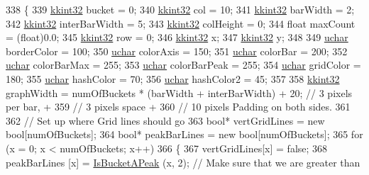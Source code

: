\begin{DoxyCode}
338 \{
339   \hyperlink{namespace_k_k_b_a8fa4952cc84fda1de4bec1fbdd8d5b1b}{kkint32} bucket        = 0;
340   \hyperlink{namespace_k_k_b_a8fa4952cc84fda1de4bec1fbdd8d5b1b}{kkint32} col           = 10;
341   \hyperlink{namespace_k_k_b_a8fa4952cc84fda1de4bec1fbdd8d5b1b}{kkint32} barWidth      = 2;
342   \hyperlink{namespace_k_k_b_a8fa4952cc84fda1de4bec1fbdd8d5b1b}{kkint32} interBarWidth = 5;
343   \hyperlink{namespace_k_k_b_a8fa4952cc84fda1de4bec1fbdd8d5b1b}{kkint32} colHeight     = 0;
344   \textcolor{keywordtype}{float}   maxCount      = (float)0.0;
345   \hyperlink{namespace_k_k_b_a8fa4952cc84fda1de4bec1fbdd8d5b1b}{kkint32} row           = 0;
346   \hyperlink{namespace_k_k_b_a8fa4952cc84fda1de4bec1fbdd8d5b1b}{kkint32} x;
347   \hyperlink{namespace_k_k_b_a8fa4952cc84fda1de4bec1fbdd8d5b1b}{kkint32} y;
348 
349   \hyperlink{namespace_k_k_b_ace9969169bf514f9ee6185186949cdf7}{uchar}  borderColor  = 100;
350   \hyperlink{namespace_k_k_b_ace9969169bf514f9ee6185186949cdf7}{uchar}  colorAxis    = 150;
351   \hyperlink{namespace_k_k_b_ace9969169bf514f9ee6185186949cdf7}{uchar}  colorBar     = 200;
352   \hyperlink{namespace_k_k_b_ace9969169bf514f9ee6185186949cdf7}{uchar}  colorBarMax  = 255;
353   \hyperlink{namespace_k_k_b_ace9969169bf514f9ee6185186949cdf7}{uchar}  colorBarPeak = 255;
354   \hyperlink{namespace_k_k_b_ace9969169bf514f9ee6185186949cdf7}{uchar}  gridColor    = 180;
355   \hyperlink{namespace_k_k_b_ace9969169bf514f9ee6185186949cdf7}{uchar}  hashColor    =  70;
356   \hyperlink{namespace_k_k_b_ace9969169bf514f9ee6185186949cdf7}{uchar}  hashColor2   =  45;
357 
358   \hyperlink{namespace_k_k_b_a8fa4952cc84fda1de4bec1fbdd8d5b1b}{kkint32}  graphWidth  = numOfBuckets * (barWidth + interBarWidth) + 20; \textcolor{comment}{//  3 pixels per bar,  +}
359                                                                        \textcolor{comment}{//  3 pixels space     +}
360                                                                        \textcolor{comment}{// 10 pixels Padding on both sides.}
361 
362   \textcolor{comment}{// Set up where Grid lines should go}
363   \textcolor{keywordtype}{bool}*  vertGridLines = \textcolor{keyword}{new} \textcolor{keywordtype}{bool}[numOfBuckets];
364   \textcolor{keywordtype}{bool}*  peakBarLines  = \textcolor{keyword}{new} \textcolor{keywordtype}{bool}[numOfBuckets];
365   \textcolor{keywordflow}{for}  (x = 0;  x < numOfBuckets;  x++)
366   \{
367     vertGridLines[x] = \textcolor{keyword}{false};
368     peakBarLines [x] = \hyperlink{class_k_k_b_1_1_histogram_afdb9c9d0c533d0f960755ef34e625d52}{IsBucketAPeak} (x, 2);  \textcolor{comment}{// Make sure that we are greater than }

\end{DoxyCode}
